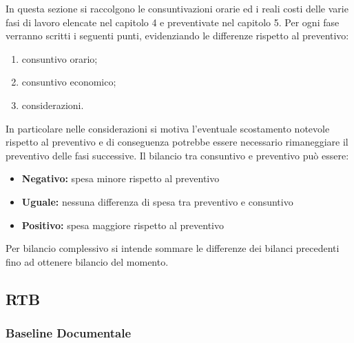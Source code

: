 In questa sezione si raccolgono le consuntivazioni orarie ed i reali costi delle varie fasi di lavoro elencate nel 
capitolo 4 e preventivate nel capitolo 5. \newline
Per ogni fase verranno scritti i seguenti punti, evidenziando le differenze rispetto al preventivo:
\begin{enumerate}
    \item consuntivo orario;
    \item consuntivo economico;
    \item considerazioni.
\end{enumerate}
In particolare nelle considerazioni si motiva l'eventuale scostamento notevole rispetto al preventivo
e di conseguenza potrebbe essere necessario rimaneggiare il preventivo delle fasi successive.
Il bilancio tra consuntivo e preventivo può essere:
\begin{itemize}
    \item \textbf{Negativo: } spesa minore rispetto al preventivo
    \item \textbf{Uguale: } nessuna differenza di spesa tra preventivo e consuntivo
    \item \textbf{Positivo: } spesa maggiore rispetto al preventivo
\end{itemize}
Per bilancio complessivo si intende sommare le differenze dei bilanci precedenti 
fino ad ottenere bilancio del momento.

\subsection{RTB}
\subsubsection{Baseline Documentale}
